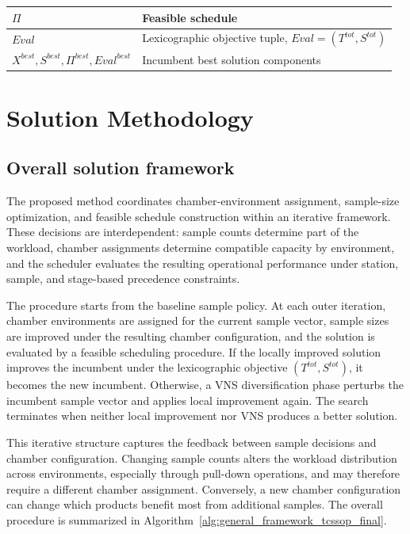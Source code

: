 \documentclass[11pt]{article}
\begin{document}
\begin{table}[H]
\begin{tabular}{|l|l|}
\(\Pi\) & Feasible schedule \\ \hline
\(Eval\) & Lexicographic objective tuple, \(Eval=(T^{tot},S^{tot})\) \\ \hline
\(X^{best},S^{best},\Pi^{best},Eval^{best}\) & Incumbent best solution components \\ \hline

\end{tabular}
\end{table}
\section{Solution Methodology}
\label{sec:solution}

\subsection{Overall solution framework}
\label{subsec:framework}

The proposed method coordinates chamber-environment assignment, sample-size optimization, and feasible schedule construction within an iterative framework. These decisions are interdependent: sample counts determine part of the workload, chamber assignments determine compatible capacity by environment, and the scheduler evaluates the resulting operational performance under station, sample, and stage-based precedence constraints.

The procedure starts from the baseline sample policy. At each outer iteration, chamber environments are assigned for the current sample vector, sample sizes are improved under the resulting chamber configuration, and the solution is evaluated by a feasible scheduling procedure. If the locally improved solution improves the incumbent under the lexicographic objective \((T^{tot},S^{tot})\), it becomes the new incumbent. Otherwise, a VNS diversification phase perturbs the incumbent sample vector and applies local improvement again. The search terminates when neither local improvement nor VNS produces a better solution.

This iterative structure captures the feedback between sample decisions and chamber configuration. Changing sample counts alters the workload distribution across environments, especially through pull-down operations, and may therefore require a different chamber assignment. Conversely, a new chamber configuration can change which products benefit most from additional samples. The overall procedure is summarized in Algorithm~\ref{alg:general_framework_tcssop_final}.
\end{document}
